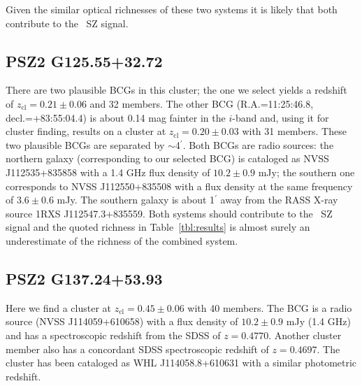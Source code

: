 \documentclass[apj, revtex4-1]{emulateapj}
\newcommand{\editorial}[1]{\textcolor{red}{#1}}
\begin{document}
Given the similar optical richnesses of these two systems it is likely that both contribute to the \planck\ SZ signal.

\subsection{PSZ2 G125.55+32.72} %
There are two plausible BCGs in this cluster; the one we select yields a redshift of $z_\mathrm{cl} = 0.21 \pm 0.06$ and 32 members. The other BCG (R.A.=11:25:46.8, decl.=+83:55:04.4) is about 0.14 mag fainter in the $i$-band and, using it for cluster finding, results on a cluster at $z_\mathrm{cl} = 0.20 \pm 0.03$ with 31 members. These two plausible BCGs are separated by $\sim$4$^\prime$. Both BCGs are radio sources: the northern galaxy (corresponding to our selected BCG) is cataloged as NVSS J112535+835858 with a 1.4 GHz flux density of $10.2 \pm 0.9$ mJy; the southern one corresponds to NVSS J112550+835508 with a flux density at the same frequency of $3.6 \pm 0.6$ mJy. The southern galaxy is about 1$^\prime$ away from the RASS X-ray source 1RXS J112547.3+835559. Both systems should contribute to the \planck\ SZ signal and the quoted richness in Table~\ref{tbl:results} is almost surely an underestimate of the richness of the combined system.


\subsection{PSZ2 G137.24+53.93} %
Here we find a cluster at $z_\mathrm{cl} = 0.45 \pm 0.06$ with 40 members. The BCG is a radio source (NVSS J114059+610658) with a flux density of $10.2 \pm 0.9$ mJy (1.4 GHz) and has a spectroscopic redshift from the SDSS of $z=0.4770$. Another cluster member also has a concordant SDSS spectroscopic redshift of $z=0.4697$. The cluster has been cataloged as WHL J114058.8+610631 with a similar photometric redshift.
\end{document}
